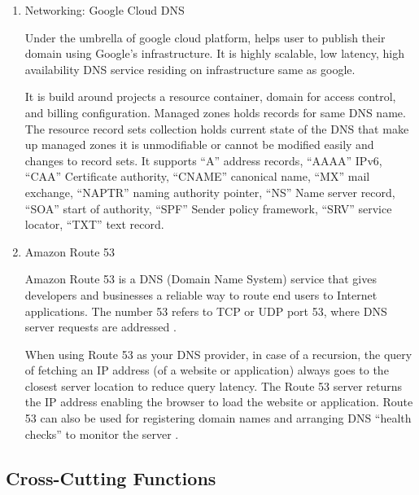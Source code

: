 \begin{enumerate}
\item {} 
Networking: Google Cloud DNS

Under the umbrella of google cloud platform, helps user to
publish their domain using Google’s infrastructure. It is highly
scalable, low latency, high availability DNS service residing on
infrastructure same as google.

It is build around projects a resource container, domain for
access control, and billing configuration. Managed zones holds
records for same DNS name. The resource record sets collection
holds current state of the DNS that make up managed zones it is
unmodifiable or cannot be modified easily and changes to record
sets. It supports “A” address records, “AAAA” IPv6, “CAA”
Certificate authority, “CNAME” canonical name, “MX” mail
exchange, “NAPTR” naming authority pointer, “NS” Name server
record, “SOA” start of authority, “SPF” Sender policy framework,
“SRV” service locator, “TXT” text record.

\item {} 
Amazon Route 53

Amazon Route 53 is a DNS (Domain Name System) service that gives
developers and businesses a reliable way to route end users to
Internet applications. The number 53 refers to TCP or UDP port
53, where DNS server requests are addressed \label{\detokenize{i524/technologies:id657}}{\hyperref[\detokenize{i524/technologies:www-ar53}]{\sphinxcrossref{{[}570{]}}}}.

When using Route 53 as your DNS provider, in case of a recursion,
the query of fetching an IP address (of a website or application)
always goes to the closest server location to reduce query
latency. The Route 53 server returns the IP address enabling the
browser to load the website or application. Route 53 can also be
used for registering domain names and arranging DNS “health
checks” to monitor the server \label{\detokenize{i524/technologies:id658}}{\hyperref[\detokenize{i524/technologies:www-amar53}]{\sphinxcrossref{{[}571{]}}}}.

\end{enumerate}


\subsection{Cross-Cutting Functions}
\label{\detokenize{i524/technologies:cross-cutting-functions}}

